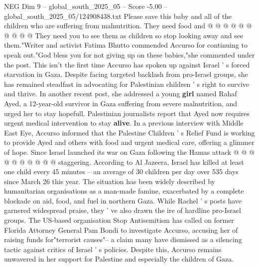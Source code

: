 \begin{textsample}{NEG Dim 9 – global\_south\_2025\_05 – Score -5.00 – global\_south\_2025\_05/124908438.txt}
Please save this baby and all of the children who are suffering from malnutrition.
They need food and @ @ @ @ @ @ @ @ @ @ They need you to see them as children so stop looking away and see them."Writer and activist Fatima Bhutto commended Accurso for continuing to speak out."God bless you for not giving up on these babies,"she commented under the post.
This isn't the first time Accurso has spoken up against Israel ' s forced starvation in Gaza.
Despite facing targeted backlash from pro-Israel groups, she has remained steadfast in advocating for Palestinian children ' s right to survive and thrive.
In another recent post, she addressed a young \textbf{girl} named Rahaf Ayed, a 12-year-old survivor in Gaza suffering from severe malnutrition, and urged her to stay hopefull.
Palestinian journalists report that Ayed now requires urgent medical intervention to stay \textbf{alive}.
In a previous interview with Middle East Eye, Accurso informed that the Palestine Children ' s Relief Fund is working to provide Ayed and others with food and urgent medical care, offering a glimmer of hope.
Since Israel launched its war on Gaza following the Hamas attack @ @ @ @ @ @ @ @ @ @ staggering.
According to Al Jazeera, Israel has killed at least one child every 45 minutes -- an average of 30 children per day over 535 days since March 26 this year.
The situation has been widely described by humanitarian organisations as a man-made famine, exacerbated by a complete blockade on aid, food, and fuel in northern Gaza.
While Rachel ' s posts have garnered widespread praise, they ' ve also drawn the ire of hardline pro-Israel groups.
The US-based organisation Stop Antisemitism has called on former Florida Attorney General Pam Bondi to investigate Accurso, accusing her of raising funds for"terrorist causes"-- a claim many have dismissed as a silencing tactic against critics of Israel ' s policies.
Despite this, Accurso remains unwavered in her support for Palestine and especially the children of Gaza.

\end{textsample}
